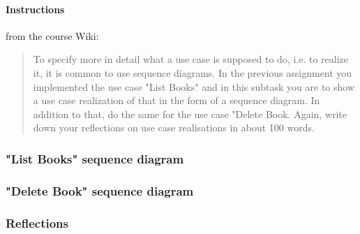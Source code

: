 \paragraph{Instructions}\label{task-1c-instructions}
from the course Wiki\cite{1dv600:lab2:instructions}:

\begin{quote}
  To specify more in detail what a use case is supposed to do, i.e. to realize
  it, it is common to use sequence diagrams. In the previous assignment you
  implemented the use case "List Books" and in this subtask you are to show a
  use case realization of that in the form of a sequence diagram. In addition
  to that, do the same for the use case "Delete Book.  Again, write down your
  reflections on use case realisations in about 100 words.
\end{quote}


\subsubsection{"List Books" sequence diagram}\label{task-1c-sequence1}
%


\subsubsection{"Delete Book" sequence diagram}\label{task-1c-sequence2}
%


\subsubsection{Reflections}\label{task-1c-reflect}
%

